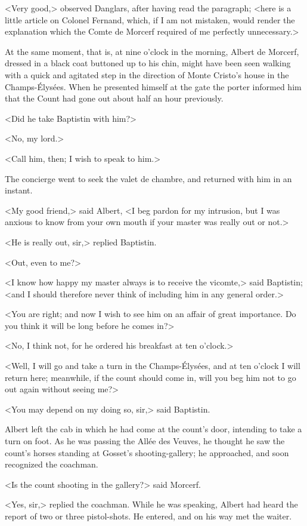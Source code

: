  <Very good,> observed Danglars, after having read the paragraph; <here is a little article on Colonel Fernand, which, if I am not mistaken, would render the explanation which the Comte de Morcerf required of me perfectly unnecessary.> 

 At the same moment, that is, at nine o'clock in the morning, Albert de Morcerf, dressed in a black coat buttoned up to his chin, might have been seen walking with a quick and agitated step in the direction of Monte Cristo's house in the Champs-Élysées. When he presented himself at the gate the porter informed him that the Count had gone out about half an hour previously. 

 <Did he take Baptistin with him?> 

 <No, my lord.> 

 <Call him, then; I wish to speak to him.> 

 The concierge went to seek the valet de chambre, and returned with him in an instant. 

 <My good friend,> said Albert, <I beg pardon for my intrusion, but I was anxious to know from your own mouth if your master was really out or not.> 

 <He is really out, sir,> replied Baptistin. 

 <Out, even to me?> 

 <I know how happy my master always is to receive the vicomte,> said Baptistin; <and I should therefore never think of including him in any general order.> 

 <You are right; and now I wish to see him on an affair of great importance. Do you think it will be long before he comes in?> 

 <No, I think not, for he ordered his breakfast at ten o'clock.> 

 <Well, I will go and take a turn in the Champs-Élysées, and at ten o'clock I will return here; meanwhile, if the count should come in, will you beg him not to go out again without seeing me?> 

 <You may depend on my doing so, sir,> said Baptistin. 

 Albert left the cab in which he had come at the count's door, intending to take a turn on foot. As he was passing the Allée des Veuves, he thought he saw the count's horses standing at Gosset's shooting-gallery; he approached, and soon recognized the coachman. 

 <Is the count shooting in the gallery?> said Morcerf. 

 <Yes, sir,> replied the coachman. While he was speaking, Albert had heard the report of two or three pistol-shots. He entered, and on his way met the waiter. 

